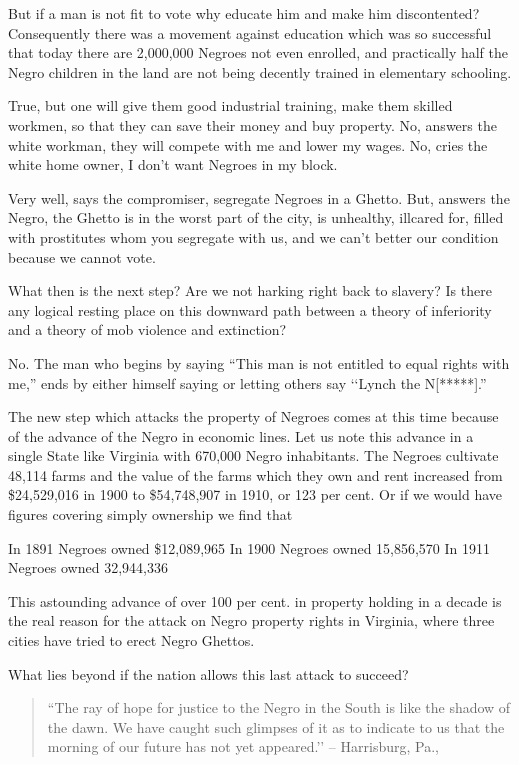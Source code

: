 \documentclass[letterpaper,10pt,english]{jupyterBook}
\begin{document}
\sphinxAtStartPar
But if a man is not fit to vote why educate him and make him discontented? Consequently there was a movement against education which was so successful that to\sphinxhyphen{}day there are 2,000,000 Negroes not even enrolled, and practically half the Negro children in the land are not being decently trained in elementary schooling.

\sphinxAtStartPar
True, but one will give them good industrial training, make them skilled workmen, so that they can save their money and buy property. No, answers the white workman, they will compete with me and lower my wages. No, cries the white home owner, I don’t want Negroes in my block.

\sphinxAtStartPar
Very well, says the compromiser, segregate Negroes in a Ghetto. But, answers the Negro, the Ghetto is in the worst part of the city, is unhealthy, ill\sphinxhyphen{}cared for, filled with prostitutes whom you segregate with us, and we can’t better our condition because we cannot vote.

\sphinxAtStartPar
What then is the next step? Are we not harking right back to slavery? Is there any logical resting place on this downward path between a theory of inferiority and a theory of mob violence and extinction?

\sphinxAtStartPar
No. The man who begins by saying “This man is not entitled to equal rights with me,” ends by either himself saying or letting others say ‘‘Lynch the N{[}*****{]}.”

\sphinxAtStartPar
The new step which attacks the property of Negroes comes at this time because of the advance of the Negro in economic lines. Let us note this advance in a single State like Virginia with 670,000 Negro inhabitants. The Negroes cultivate 48,114 farms and the value of the farms which they own and rent increased from \$24,529,016 in 1900 to \$54,748,907 in 1910, or 123 per cent. Or if we would have figures covering simply ownership we find that

\sphinxAtStartPar
In 1891 Negroes owned \$12,089,965
In 1900 Negroes owned 15,856,570
In 1911 Negroes owned 32,944,336

\sphinxAtStartPar
This astounding advance of over 100 per cent. in property holding in a decade is the real reason for the attack on Negro property rights in Virginia, where three cities have tried to erect Negro Ghettos.

\sphinxAtStartPar
What lies beyond if the nation allows this last attack to succeed?
\begin{quote}

\sphinxAtStartPar
“The ray of hope for justice to the Negro in the South is like the shadow of the dawn. We have caught such glimpses of it as to indicate to us that the morning of our future has not yet appeared.’’
– Harrisburg, Pa., 
\end{quote}
\end{document}

